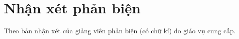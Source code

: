 \chapter*{Nhận xét phản biện}


Theo bản nhận xét của giảng viên phản biện (có chữ kí) do giáo vụ cung cấp.